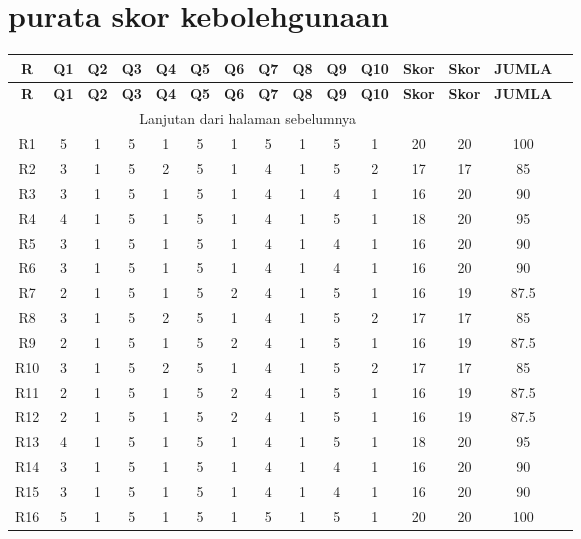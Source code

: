 {{\section*{purata skor kebolehgunaan}

\begin{longtable}{|c|c|c|c|c|c|c|c|c|c|c|c|c|c|c|}
\hline
\textbf{R} & \textbf{Q1} & \textbf{Q2} & \textbf{Q3} & \textbf{Q4} & \textbf{Q5} & \textbf{Q6} & \textbf{Q7} & \textbf{Q8} & \textbf{Q9} & \textbf{Q10} & \textbf{Skor} & \textbf{Skor} & \textbf{JUMLA} \\
\hline
\endfirsthead
\hline
\textbf{R} & \textbf{Q1} & \textbf{Q2} & \textbf{Q3} & \textbf{Q4} & \textbf{Q5} & \textbf{Q6} & \textbf{Q7} & \textbf{Q8} & \textbf{Q9} & \textbf{Q10} & \textbf{Skor} & \textbf{Skor} & \textbf{JUMLA} \\
\hline
\endhead
\hline
\multicolumn{13}{|c|}{Lanjutan dari halaman sebelumnya} \\
\hline
\endfoot
\hline
\endlastfoot
R1 & 5 & 1 & 5 & 1 & 5 & 1 & 5 & 1 & 5 & 1 & 20 & 20 & 100 \\
R2 & 3 & 1 & 5 & 2 & 5 & 1 & 4 & 1 & 5 & 2 & 17 & 17 & 85 \\
R3 & 3 & 1 & 5 & 1 & 5 & 1 & 4 & 1 & 4 & 1 & 16 & 20 & 90 \\
R4 & 4 & 1 & 5 & 1 & 5 & 1 & 4 & 1 & 5 & 1 & 18 & 20 & 95 \\
R5 & 3 & 1 & 5 & 1 & 5 & 1 & 4 & 1 & 4 & 1 & 16 & 20 & 90 \\
R6 & 3 & 1 & 5 & 1 & 5 & 1 & 4 & 1 & 4 & 1 & 16 & 20 & 90 \\
R7 & 2 & 1 & 5 & 1 & 5 & 2 & 4 & 1 & 5 & 1 & 16 & 19 & 87.5 \\
R8 & 3 & 1 & 5 & 2 & 5 & 1 & 4 & 1 & 5 & 2 & 17 & 17 & 85 \\
R9 & 2 & 1 & 5 & 1 & 5 & 2 & 4 & 1 & 5 & 1 & 16 & 19 & 87.5 \\
R10 & 3 & 1 & 5 & 2 & 5 & 1 & 4 & 1 & 5 & 2 & 17 & 17 & 85 \\
R11 & 2 & 1 & 5 & 1 & 5 & 2 & 4 & 1 & 5 & 1 & 16 & 19 & 87.5 \\
R12 & 2 & 1 & 5 & 1 & 5 & 2 & 4 & 1 & 5 & 1 & 16 & 19 & 87.5 \\
R13 & 4 & 1 & 5 & 1 & 5 & 1 & 4 & 1 & 5 & 1 & 18 & 20 & 95 \\
R14 & 3 & 1 & 5 & 1 & 5 & 1 & 4 & 1 & 4 & 1 & 16 & 20 & 90 \\
R15 & 3 & 1 & 5 & 1 & 5 & 1 & 4 & 1 & 4 & 1 & 16 & 20 & 90 \\
R16 & 5 & 1 & 5 & 1 & 5 & 1 & 5 & 1 & 5 & 1 & 20 & 20 & 100 \\

\end{longtable}}}
